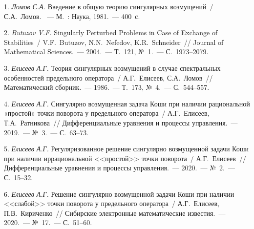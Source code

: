\litlist

1. {\it Ломов С.А.} Введение в общую теорию сингулярных возмущений~/ С.А.~Ломов. ~--- М.~: Наука, 1981.~--- 400~с.

2. {\it Butuzov V.F.} Singularly Perturbed Problems in Case of Exchange of Stabilities~/ V.F.~Butuzov, N.N.~Nefedov, K.R.~Schneider~// Journal of Mathematical Sciences.~--- 2004.~--- Т.~121, №~1.~--- С.~1973--2079.

3. {\it Елисеев А.Г.} Теория сингулярных возмущений в случае спектральных особенностей предельного оператора~/ А.Г.~Елисеев, \linebreak С.А.~Ломов~// Математический сборник.~--- 1986.~--- Т.~173, №~4.~--- С.~544--557.

4. {\it Елисеев А.Г.} Сингулярно возмущенная задача Коши при наличии рациональной «простой» точки поворота у предельного оператора~/ А.Г.~Елисеев, Т.А.~Ратникова~// Дифференциальные уравнения и процессы управления.~--- 2019.~--- №~3.~--- С.~63--73.

5. {\it Елисеев А.Г.} Регуляризованное решение сингулярно возмущенной задачи Коши при наличии иррациональной <<простой>> точки поворота~/ А.Г.~Елисеев~// Дифференциальные уравнения и процессы управления.~--- 2020.~--- №~2.~--- С.~15--32.

6. {\it Елисеев А.Г.} Решение сингулярно возмущенной задачи Коши при наличии <<слабой>> точки поворота у предельного оператора~/ А.Г.~Елисеев, П.В.~Кириченко~// Сибирские электронные математические известия.~--- 2020.~--- №~17.~--- С.~51--60.

